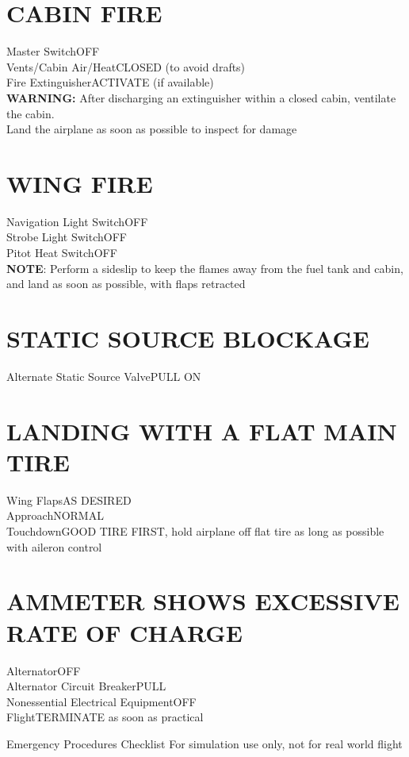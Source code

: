 \documentclass{article}
\begin{document}
\begin{multicols*}{2}
\section*{CABIN FIRE}
Master Switch\dotfill OFF\\
Vents/Cabin Air/Heat\dotfill CLOSED (to avoid drafts)\\
Fire Extinguisher\dotfill ACTIVATE (if available)\\
\centering \textbf{WARNING:}
After discharging an extinguisher within a closed cabin, ventilate the cabin.\\
Land the airplane as soon as possible to inspect for damage
\section*{WING FIRE}
Navigation Light Switch\dotfill OFF\\
Strobe Light Switch\dotfill OFF\\
Pitot Heat Switch\dotfill OFF\\
\centering \textbf{NOTE}:
Perform a sideslip to keep the flames away from the fuel tank and cabin, and land as soon as possible, with flaps retracted
\section*{STATIC SOURCE BLOCKAGE}
Alternate Static Source Valve\dotfill PULL ON
\section*{LANDING WITH A FLAT MAIN TIRE}
Wing Flaps\dotfill AS DESIRED\\
Approach\dotfill NORMAL\\
Touchdown\dotfill GOOD TIRE FIRST, hold airplane off flat tire as long as possible with aileron control
\section*{AMMETER SHOWS EXCESSIVE RATE OF CHARGE}
Alternator\dotfill OFF\\
Alternator Circuit Breaker\dotfill PULL\\
Nonessential Electrical Equipment\dotfill OFF\\
Flight\dotfill TERMINATE as soon as practical
\end{multicols*}
\newpage
\centering
{\fontsize{20.74}{70}\selectfont Emergency Procedures Checklist}
\break
\color{Red}
{\fontsize{10}{70}\selectfont For simulation use only, not for real world flight}
\color{Black}
\end{document}
